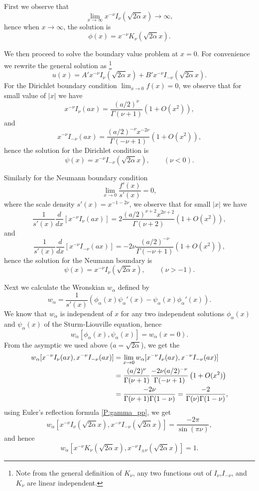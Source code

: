 First we observe that
\[
  \lim_{x\to\infty} x^{-\nu} I_{\nu}(\sqrt{2\alpha}x) \to\infty,
\]
hence when $x\to\infty$, the solution is
\[
  \phi(x) = x^{-\nu} K_{\nu}(\sqrt{2\alpha}x).
\]

We then proceed to solve the boundary value problem at $x=0$. 
For convenience we rewrite the general solution as
\footnote{Note from the general definition of $K_{\nu}$, any two functions out
    of $I_{\nu}$,$I_{-\nu}$, and $K_{\nu}$ are linear independent.}
\[
  u(x) = A' x^{-\nu} I_{\nu}(\sqrt{2\alpha}x) + 
         B' x^{-\nu} I_{-\nu}(\sqrt{2\alpha}x).
\]
For the Dirichlet boundary condition $\lim_{x\to 0} f(x)=0$, we observe 
that for small value of $|x|$ we have
\[
  x^{-\nu} I_{\nu}(a x) = \frac{(a/2)^{\nu}}{\Gamma(\nu+1)} 
                          \left( 1+ O(x^2) \right),
\]
and 
\[
  x^{-\nu} I_{-\nu}(a x) = \frac{(a/2)^{-\nu} x^{-2\nu}}{\Gamma(-\nu+1)} 
                          \left( 1+ O(x^2) \right),
\]
hence the solution for the Dirichlet condition is
\[
  \psi(x) = x^{-\nu} I_{-\nu}(\sqrt{2\alpha} x), \qquad (\nu<0).
\]

Similarly for the Neumann boundary condition
\[
  \lim_{x\to 0} \frac{f'(x)}{s'(x)}=0,
\]
where the scale density $s'(x)=x^{-1-2\nu}$,
we observe that for small $|x|$ we have
\[
  \frac{1}{s'(x)} \frac{d}{dx} [x^{-\nu} I_{\nu}(a x)] 
    = 2\frac{(a/2)^{\nu+2} x^{2\nu+2}}{\Gamma(\nu+2)} \left( 1+ O(x^2) \right),
\]
and 
\[
  \frac{1}{s'(x)} \frac{d}{dx} [x^{-\nu} I_{-\nu}(a x)] 
    = -2\nu \frac{(a/2)^{-\nu}}{\Gamma(-\nu+1)} \left( 1+ O(x^2) \right),
\]
hence the solution for the Neumann boundary is
\[
  \psi(x) = x^{-\nu} I_{\nu}(\sqrt{2\alpha} x), \qquad (\nu>-1).
\]

Next we calculate the Wronskian $w_{\alpha}$ defined by
\[
  w_{\alpha} = \frac{1}{s'(x)} (\phi_{\alpha}(x) \psi_{\alpha}'(x)
                                - \psi_{\alpha}(x) \phi_{\alpha}'(x) ).
\]
We know that $w_{\alpha}$ is independent of $x$ for any two independent
solutions $\phi_{\alpha}(x)$ and $\psi_{\alpha}(x)$ of the Sturm-Liouville
equation, hence 
\[
  w_{\alpha}[\phi_{\alpha}(x),\psi_{\alpha}(x)] = w_{\alpha}(x=0).
\]
From the asymptic we used above ($a=\sqrt{2\alpha}$), we get the 
\begin{align*}
  w_{\alpha}[x^{-\nu} I_{\nu}(ax), x^{-\nu} I_{-\nu}(ax)]
  &= \lim_{x\to 0} w_{\alpha}[x^{-\nu} I_{\nu}(ax), x^{-\nu} I_{-\nu}(ax)]
     \notag \\
  &= \frac{(a/2)^{\nu}}{\Gamma(\nu+1)} 
     \frac{-2\nu (a/2)^{-\nu}}{\Gamma(-\nu+1)} \left( 1+ O(x^2) \right)
     \notag \\
  &= \frac{-2\nu}{\Gamma(\nu+1)\Gamma(1-\nu)}
     = \frac{-2}{\Gamma(\nu)\Gamma(1-\nu)}, \notag 
\end{align*}
using Euler's reflection formula \ref{P:gamma_pp}, we get
\begin{equation}
  w_{\alpha}[x^{-\nu} I_{\nu}(\sqrt{2\alpha} x), 
    x^{-\nu} I_{-\nu}(\sqrt{2\alpha}x)]
  = \frac{-2\pi}{\sin(\pi\nu)},
\end{equation}
and hence
\begin{equation}
  w_{\alpha}[x^{-\nu} K_{\nu}(\sqrt{2\alpha} x), 
    x^{-\nu} I_{\pm\nu}(\sqrt{2\alpha}x)] = 1.
\end{equation}


